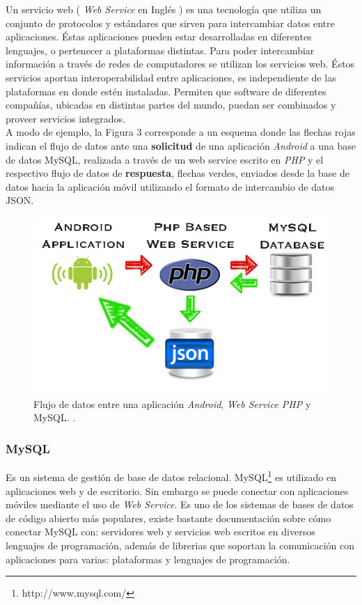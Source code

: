 Un servicio web ( \textit{Web Service} en Inglés ) es una tecnología que utiliza un conjunto de protocolos y estándares que sirven para intercambiar datos entre aplicaciones. Éstas aplicaciones pueden estar desarrolladas en diferentes lenguajes, o pertenecer a plataformas distintas. Para poder intercambiar información a través de redes de computadores se utilizan los servicios web. Éstos servicios aportan interoperabilidad entre aplicaciones, es independiente de las plataformas en donde estén instaladas. Permiten que software de diferentes compañías, ubicadas en distintas partes del mundo, puedan ser combinados y proveer servicios integrados.\\

A modo de ejemplo, la Figura 3 corresponde a un esquema donde las flechas rojas indican el flujo de datos ante una \textbf{solicitud} de una aplicación \textit{Android} a una base de datos MySQL, realizada a través de un web service escrito en \textit{PHP} y el respectivo flujo de datos de \textbf{respuesta}, flechas verdes, enviados desde la base de datos hacia la aplicación móvil utilizando el formato de intercambio de datos JSON.\\

\begin{figure}[H]
\centering
\includegraphics[scale=0.65]{images/capitulo2/webServiceJSON.png}
\caption{Flujo de datos entre una aplicación \textit{Android}, \textit{Web Service PHP} y MySQL. \cite{Myb13}.}
\label{webService}
\end{figure}

\subsubsection{MySQL}
Es un sistema de gestión de base de datos relacional. MySQL\footnote{http://www.mysql.com/} es utilizado en aplicaciones web y de escritorio. Sin embargo se puede conectar con aplicaciones móviles mediante el uso de \textit{Web Service}. Es uno de los sistemas de bases de datos de código abierto más populares, existe bastante documentación sobre cómo conectar MySQL con: servidores web y servicios web escritos en diversos lenguajes de programación, además de librerias que soportan la comunicación con aplicaciones para varias: plataformas y lenguajes de programación.\\

